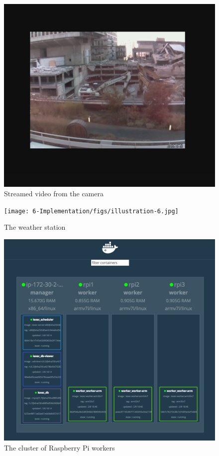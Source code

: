     \begin{figure}[!h]\centering
        \includegraphics[width=\columnwidth]{6-Implementation/figs/illustration-8.png}
        \caption{Streamed video from the camera}
    \end{figure}

    \begin{figure}[!h]\centering
        \texttt{[image: 6-Implementation/figs/illustration-6.jpg]}
        \caption{The weather station}
    \end{figure}

    \begin{figure}[!h]\centering
        \includegraphics[width=\columnwidth]{6-Implementation/figs/illustration-7.png}
        \caption{The cluster of Raspberry Pi workers}
    \end{figure}


